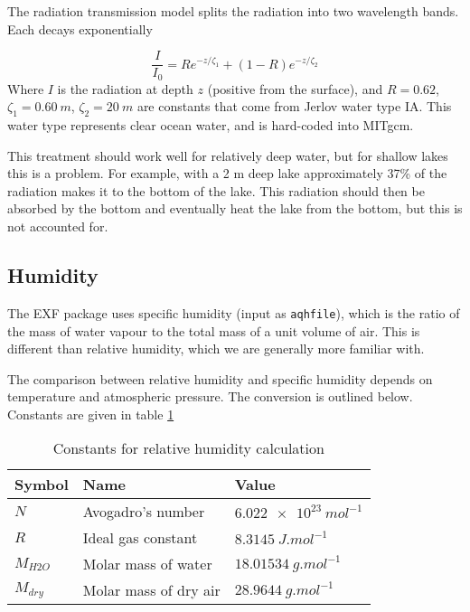 \documentclass[11pt]{article}
\begin{document}
The radiation transmission model \cite{PaulsonSimpson1977} splits the radiation into two wavelength bands. Each decays exponentially

\begin{equation}
\frac{I}{I_0} = R e^{-z/\zeta_1} + (1 - R) e^{-z/\zeta_2}
\end{equation}
Where $I$ is the radiation at depth $z$ (positive from the surface), and $R = 0.62$, $\zeta_1 = \SI{0.60}{m}$, $\zeta_2 = \SI{20}{m}$ are constants that come from Jerlov water type IA. This water type represents clear ocean water, and is hard-coded into MITgcm.

This treatment should work well for relatively deep water, but for shallow lakes this is a problem. For example, with a 2 m deep lake approximately 37\% of the radiation makes it to the bottom of the lake. This radiation should then be absorbed by the bottom and eventually heat the lake from the bottom, but this is not accounted for.

\subsection{Humidity}
The EXF package uses specific humidity (input as \verb|aqhfile|), which is the ratio of the mass of water vapour to the total mass of a unit volume of air. This is different than relative humidity, which we are generally more familiar with.

The comparison between relative humidity and specific humidity depends on temperature and atmospheric pressure. The conversion is outlined below. Constants are given in table \ref{table:humidityConstants}

\begin{table}
\begin{tabularx}{\textwidth}{X X X}
\hline
\textbf{Symbol} & \textbf{Name} & \textbf{Value} \\ \hline \hline
$N$ & Avogadro's number & $\SI{6.022e23}{{mol}^{-1}}$ \\ \hline
$R$ & Ideal gas constant & $\SI{8.3145}{J.{mol}^{-1}}$ \\ \hline
$M_{H2O}$ & Molar mass of water & $\SI{18.01534}{g.{mol}^{-1}}$ \\ \hline
$M_{dry}$ & Molar mass of dry air & $\SI{28.9644}{g.{mol}^{-1}}$ \\ \hline
\end{tabularx}
\caption{Constants for relative humidity calculation}
\label{table:humidityConstants}
\end{table}
\end{document}
